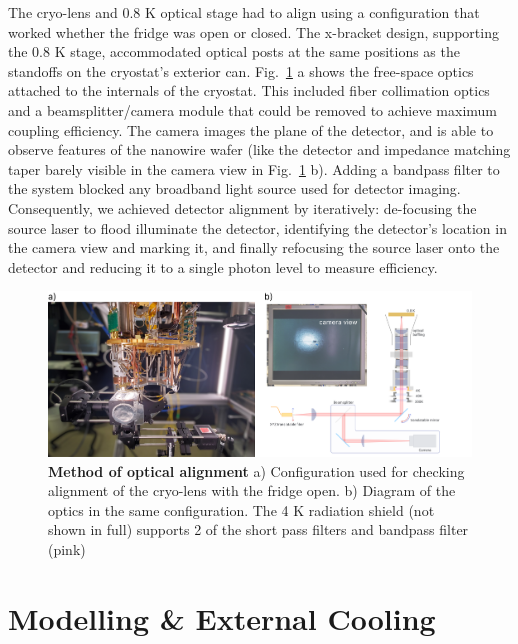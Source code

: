 \documentclass[11pt]{caltech_thesis} %
\begin{document}
The cryo-lens and 0.8 K optical stage had to align using a configuration that worked whether the fridge was open or closed. The x-bracket design, supporting the 0.8 K stage, accommodated optical posts at the same positions as the standoffs on the cryostat's exterior can. Fig.~\ref{fig:optics_alignment} a shows the free-space optics attached to the internals of the cryostat. This included fiber collimation optics and a beamsplitter/camera module that could be removed to achieve maximum coupling efficiency. The camera images the plane of the detector, and is able to observe features of the nanowire wafer (like the detector and impedance matching taper barely visible in the camera view in Fig.~\ref{fig:optics_alignment} b). Adding a bandpass filter to the system blocked any broadband light source used for detector imaging. Consequently, we achieved detector alignment by iteratively: de-focusing the source laser to flood illuminate the detector, identifying the detector's location in the camera view and marking it, and finally refocusing the source laser onto the detector and reducing it to a single photon level to measure efficiency.

\hypertarget{fig:optics_alignment}{%
\begin{figure}
\centering
\includegraphics[width=1\textwidth,height=\textheight]{./chapter_02/figs/dcrmin_alignment_light.png}
\caption[{Method of optical alignment}]{\textbf{Method of optical alignment} a) Configuration used for checking alignment of the cryo-lens with the fridge open. b) Diagram of the optics in the same configuration. The 4 K radiation shield (not shown in full) supports 2 of the short pass filters and bandpass filter (pink)}
\label{fig:optics_alignment}
\end{figure}
}

\hypertarget{modelling-external-cooling}{%
\section{Modelling \& External Cooling}\label{modelling-external-cooling}}
\end{document}
